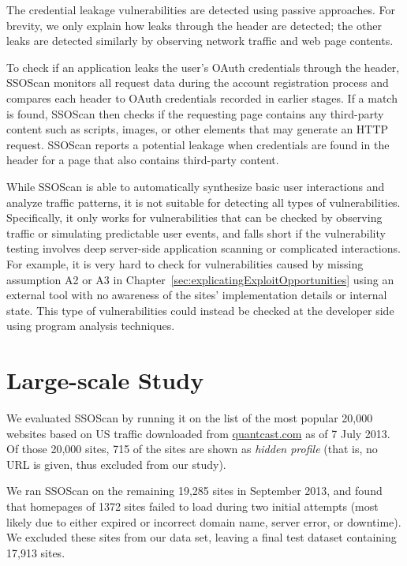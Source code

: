   The credential leakage vulnerabilities are detected using passive approaches.  For brevity, we only explain how leaks through the  header are detected; the other leaks are detected similarly by observing network traffic and web page contents.

To check if an application leaks the user's OAuth credentials through the  header, SSOScan monitors all request data during the account registration process and compares each  header to OAuth credentials recorded in earlier stages.  If a match is found, SSOScan then checks if the requesting page contains any third-party content such as scripts, images, or other elements that may generate an HTTP request.  SSOScan reports a potential leakage when credentials are found in the  header for a page that also contains third-party content.

  While SSOScan is able to automatically synthesize basic user interactions and analyze traffic patterns, it is not suitable for detecting all types of vulnerabilities.  Specifically, it only works for vulnerabilities that can be checked by observing traffic or simulating predictable user events, and falls short if the vulnerability testing involves deep server-side application scanning or complicated interactions.  For example, it is very hard to check for vulnerabilities caused by missing assumption A2 or A3 in Chapter~\ref{sec:explicatingExploitOpportunities} using an external tool with no awareness of the sites' implementation details or internal state.  This type of vulnerabilities could instead be checked at the developer side using program analysis techniques.

\section{Large-scale Study}
\label{sec:ssoscanStudy}

We evaluated SSOScan by running it on the list of the most popular 20,000 websites based on US traffic downloaded from \url{quantcast.com} as of 7 July 2013.  Of those 20,000 sites, 715 of the sites are shown as \emph{hidden profile} (that is, no URL is given, thus excluded from our study).  

We ran SSOScan on the remaining 19,285 sites in September 2013, and found that homepages of 1372 sites failed to load during two initial attempts (most likely due to either expired or incorrect domain name, server error, or downtime).  We excluded these sites from our data set, leaving a final test dataset containing 17,913 sites.

